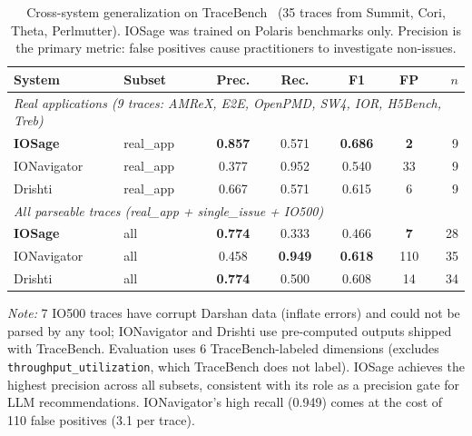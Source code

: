 \begin{table}[t]
\centering
\caption{Cross-system generalization on TraceBench~\cite{egersdoerfer2025ioagent} (35
traces from Summit, Cori, Theta, Perlmutter). IOSage was trained on Polaris
benchmarks only. Precision is the primary metric: false positives cause
practitioners to investigate non-issues.}
\label{tab:tracebench}
\small
\begin{tabular}{llccccr}
\toprule
\textbf{System} & \textbf{Subset} & \textbf{Prec.} & \textbf{Rec.} & \textbf{F1} & \textbf{FP} & \textbf{$n$} \\
\midrule
\multicolumn{7}{l}{\textit{Real applications (9 traces: AMReX, E2E, OpenPMD, SW4, IOR, H5Bench, Treb)}} \\
\textbf{IOSage}            & real\_app & \textbf{0.857} & 0.571 & \textbf{0.686} & \textbf{2}    & 9 \\
IONavigator                & real\_app & 0.377          & 0.952 & 0.540          & 33            & 9 \\
Drishti                    & real\_app & 0.667          & 0.571 & 0.615          & 6             & 9 \\
\midrule
\multicolumn{7}{l}{\textit{All parseable traces (real\_app + single\_issue + IO500)}} \\
\textbf{IOSage}            & all      & \textbf{0.774} & 0.333 & 0.466          & \textbf{7}    & 28 \\
IONavigator                & all      & 0.458          & \textbf{0.949} & \textbf{0.618} & 110  & 35 \\
Drishti                    & all      & \textbf{0.774} & 0.500 & 0.608          & 14            & 34 \\
\bottomrule
\end{tabular}
\vspace{1mm}
\raggedright
\footnotesize
\textit{Note:} 7 IO500 traces have corrupt Darshan data (inflate errors) and
could not be parsed by any tool; IONavigator and Drishti use pre-computed
outputs shipped with TraceBench. Evaluation uses 6 TraceBench-labeled
dimensions (excludes \texttt{throughput\_utilization}, which TraceBench does
not label). IOSage achieves the highest precision across all subsets,
consistent with its role as a precision gate for LLM recommendations.
IONavigator's high recall (0.949) comes at the cost of 110 false positives
(3.1 per trace).
\end{table}
